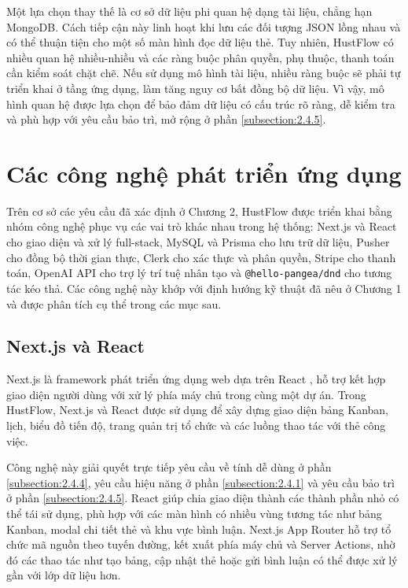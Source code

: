 \documentclass[../DoAn.tex]{subfiles}
\begin{document}
Một lựa chọn thay thế là cơ sở dữ liệu phi quan hệ dạng tài liệu, chẳng hạn MongoDB. Cách tiếp cận này linh hoạt khi lưu các đối tượng JSON lồng nhau và có thể thuận tiện cho một số màn hình đọc dữ liệu thẻ. Tuy nhiên, HustFlow có nhiều quan hệ nhiều-nhiều và các ràng buộc phân quyền, phụ thuộc, thanh toán cần kiểm soát chặt chẽ. Nếu sử dụng mô hình tài liệu, nhiều ràng buộc sẽ phải tự triển khai ở tầng ứng dụng, làm tăng nguy cơ bất đồng bộ dữ liệu. Vì vậy, mô hình quan hệ được lựa chọn để bảo đảm dữ liệu có cấu trúc rõ ràng, dễ kiểm tra và phù hợp với yêu cầu bảo trì, mở rộng ở phần \ref{subsection:2.4.5}.

\section{Các công nghệ phát triển ứng dụng}
\label{section:3.2}

Trên cơ sở các yêu cầu đã xác định ở Chương 2, HustFlow được triển khai bằng nhóm công nghệ phục vụ các vai trò khác nhau trong hệ thống: Next.js và React cho giao diện và xử lý full-stack, MySQL và Prisma cho lưu trữ dữ liệu, Pusher cho đồng bộ thời gian thực, Clerk cho xác thực và phân quyền, Stripe cho thanh toán, OpenAI API cho trợ lý trí tuệ nhân tạo và \texttt{@hello-pangea/dnd} cho tương tác kéo thả. Các công nghệ này khớp với định hướng kỹ thuật đã nêu ở Chương 1 và được phân tích cụ thể trong các mục sau.

\subsection{Next.js và React}
\label{subsection:3.2.1}

Next.js \cite{nextjs} là framework phát triển ứng dụng web dựa trên React \cite{reactjs}, hỗ trợ kết hợp giao diện người dùng với xử lý phía máy chủ trong cùng một dự án. Trong HustFlow, Next.js và React được sử dụng để xây dựng giao diện bảng Kanban, lịch, biểu đồ tiến độ, trang quản trị tổ chức và các luồng thao tác với thẻ công việc.

Công nghệ này giải quyết trực tiếp yêu cầu về tính dễ dùng ở phần \ref{subsection:2.4.4}, yêu cầu hiệu năng ở phần \ref{subsection:2.4.1} và yêu cầu bảo trì ở phần \ref{subsection:2.4.5}. React giúp chia giao diện thành các thành phần nhỏ có thể tái sử dụng, phù hợp với các màn hình có nhiều vùng tương tác như bảng Kanban, modal chi tiết thẻ và khu vực bình luận. Next.js App Router hỗ trợ tổ chức mã nguồn theo tuyến đường, kết xuất phía máy chủ và Server Actions, nhờ đó các thao tác như tạo bảng, cập nhật thẻ hoặc gửi bình luận có thể được xử lý gần với lớp dữ liệu hơn.
\end{document}
